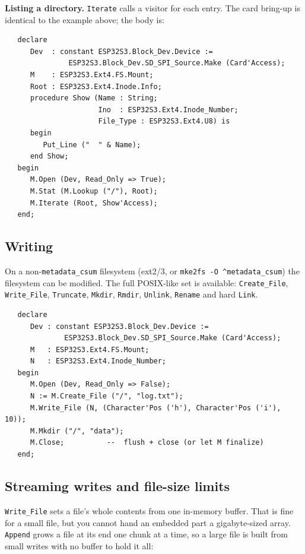 \textbf{Listing a directory.} \texttt{Iterate} calls a visitor for each entry.
The card bring-up is identical to the example above; the body is:

\begin{lstlisting}
   declare
      Dev  : constant ESP32S3.Block_Dev.Device :=
               ESP32S3.Block_Dev.SD_SPI_Source.Make (Card'Access);
      M    : ESP32S3.Ext4.FS.Mount;
      Root : ESP32S3.Ext4.Inode.Info;
      procedure Show (Name : String;
                      Ino  : ESP32S3.Ext4.Inode_Number;
                      File_Type : ESP32S3.Ext4.U8) is
      begin
         Put_Line ("  " & Name);
      end Show;
   begin
      M.Open (Dev, Read_Only => True);
      M.Stat (M.Lookup ("/"), Root);
      M.Iterate (Root, Show'Access);
   end;
\end{lstlisting}

\subsection{Writing}

On a non-\texttt{metadata\_csum} filesystem (ext2/3, or
\texttt{mke2fs -O \textasciicircum metadata\_csum}) the filesystem can be modified.
The full POSIX-like set is available: \texttt{Create\_File}, \texttt{Write\_File},
\texttt{Truncate}, \texttt{Mkdir}, \texttt{Rmdir}, \texttt{Unlink},
\texttt{Rename} and hard \texttt{Link}.

\begin{lstlisting}
   declare
      Dev : constant ESP32S3.Block_Dev.Device :=
              ESP32S3.Block_Dev.SD_SPI_Source.Make (Card'Access);
      M   : ESP32S3.Ext4.FS.Mount;
      N   : ESP32S3.Ext4.Inode_Number;
   begin
      M.Open (Dev, Read_Only => False);
      N := M.Create_File ("/", "log.txt");
      M.Write_File (N, (Character'Pos ('h'), Character'Pos ('i'), 10));
      M.Mkdir ("/", "data");
      M.Close;          --  flush + close (or let M finalize)
   end;
\end{lstlisting}

\subsection{Streaming writes and file-size limits}

\texttt{Write\_File} sets a file's whole contents from one in-memory buffer.
That is fine for a small file, but you cannot hand an embedded part a gigabyte-sized
array. \texttt{Append} grows a file at its end one chunk at a time, so a large
file is built from small writes with no buffer to hold it all:

